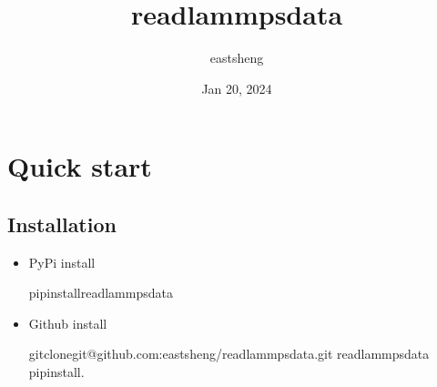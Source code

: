 \documentclass[letterpaper,10pt,english]{sphinxmanual}
\title{readlammpsdata}
\date{Jan 20, 2024}
\author{eastsheng}
\begin{document}
\pagestyle{empty}
\sphinxmaketitle
\pagestyle{plain}
\sphinxtableofcontents
\pagestyle{normal}
\label{\detokenize{index::doc}}


\sphinxstepscope


\chapter{Quick start}
\label{\detokenize{quick_start:quick-start}}\label{\detokenize{quick_start::doc}}

\section{Installation}
\label{\detokenize{quick_start:installation}}\begin{itemize}
\item {} 
\sphinxAtStartPar
PyPi install

\begin{sphinxVerbatim}[commandchars=\\\{\}]
pipinstallreadlammpsdata
\end{sphinxVerbatim}

\item {} 
\sphinxAtStartPar
Github install

\begin{sphinxVerbatim}[commandchars=\\\{\}]
gitclonegit@github.com:eastsheng/readlammpsdata.git
readlammpsdata
pipinstall.
\end{sphinxVerbatim}

\end{itemize}
\end{document}
